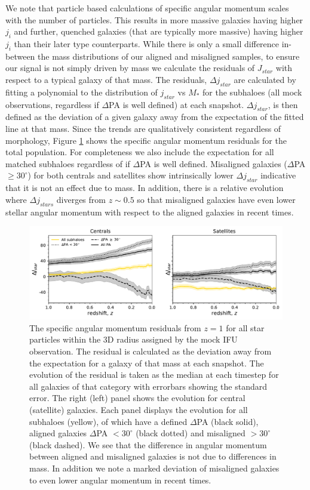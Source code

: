 \documentclass[fleqn,usenatbib]{mnras}
\begin{document}
We note that particle based calculations of specific angular momentum scales with the number of particles. This results in more massive galaxies having higher $j_{i}$ and further, quenched galaxies (that are typically more massive) having higher $j_{i}$ than their later type counterparts. While there is only a small difference in-between the mass distributions of our aligned and misaligned samples, to ensure our signal is not simply driven by mass we calculate the residuals of $J_{star}$ with respect to a typical galaxy of that mass. The residuals, $\Delta j_{star}$ are calculated by fitting a polynomial to the distribution of $j_{star}$ vs $M_{\ast}$ for the subhaloes (all mock observations, regardless if $\Delta$PA is well defined) at each snapshot. $\Delta j_{star}$, is then defined as the deviation of a given galaxy away from the expectation of the fitted line at that mass. Since the trends are qualitatively consistent regardless of morphology, Figure \ref{fig:sJ_evo_residual} shows the specific angular momentum residuals for the total population. For completeness we also include the expectation for all matched subhaloes regardless of if $\Delta$PA is well defined. Misaligned galaxies ($\Delta$PA $\geq 30^{\circ}$) for both centrals and satellites show intrinsically lower $\Delta j_{star}$ indicative that it is not an effect due to mass. In addition, there is a relative evolution where $\Delta j_{stars}$ diverges from $z \sim 0.5$ so that misaligned galaxies have even lower stellar angular momentum with respect to the aligned galaxies in recent times.

\begin{figure}
	\includegraphics[width=\linewidth]{tng_results/delta_j_stars_residuals.pdf}
    \caption{The specific angular momentum residuals from $z=1$ for all star particles within the 3D radius assigned by the mock IFU observation. The residual is calculated as the deviation away from the expectation for a galaxy of that mass at each snapshot. The evolution of the residual is taken as the median at each timestep for all galaxies of that category with errorbars showing the standard error. The right (left) panel shows the evolution for central (satellite) galaxies. Each panel displays the evolution for all subhaloes (yellow), of which have a defined $\Delta$PA (black solid), aligned galaxies $\Delta$PA $< 30^{\circ}$ (black dotted) and misaligned $> 30^{\circ}$ (black dashed). We see that the difference in angular momentum between aligned and misaligned galaxies is not due to differences in mass. In addition we note a marked deviation of misaligned galaxies to even lower angular momentum in recent times.}
    \label{fig:sJ_evo_residual}
\end{figure}
\end{document}
